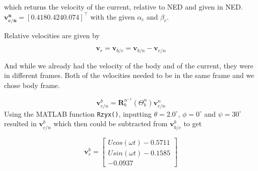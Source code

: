 which returns the velocity of the current, relative to NED and given in NED. $\mathbf{v^n_{c/n}} = [0.418 0.424 0.074]^\top$ with the given $\alpha_c$ and $\beta_c$. 

Relative velocities are given by

\begin{equation}
    \boldsymbol{v}_r = \boldsymbol{v}_{b/c} = \boldsymbol{v}_{b/n} - \boldsymbol{v}_{c/n}
    \label{eq_v_r}
\end{equation}

And while we already had the velocity of the body and of the current, they were in different frames. Both of the velocities needed to be in the same frame and we chose body frame.

\begin{equation}
    \mathbf{v}^b_{c/n} = \mathbf{R}_b^{n^{-1}}(\Theta^n_b)\mathbf{v}_{c/n}^n
\end{equation}
Using the MATLAB function \texttt{Rzyx()}, inputting $\theta = 2.0^\circ$, $\phi = 0^\circ$ and $\psi = 30^\circ$ resulted in $\mathbf{v}_{c/n}^b$ which then could be subtracted from $\mathbf{v}_{b/c}^b$ to get

\begin{equation}
    \boldsymbol{v}_r^b = 
    \begin{bmatrix}
        U cos(\omega t) - 0.5711 \\
        U sin(\omega t) - 0.1585 \\
        - 0.0937
    \end{bmatrix}
\end{equation}

